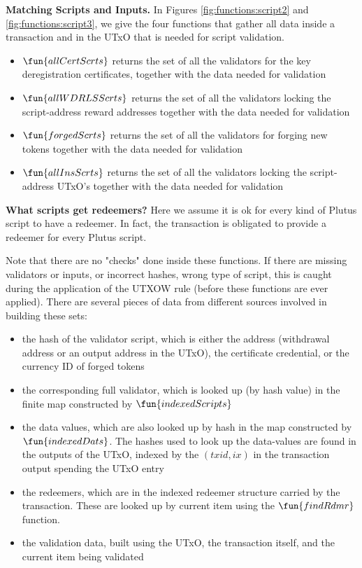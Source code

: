 \textbf{Matching Scripts and Inputs.}
In Figures \ref{fig:functions:script2} and \ref{fig:functions:script3},
we give the four functions that gather all data inside a transaction
and in the UTxO that is needed for script validation.

\begin{itemize}
\item $\fun{allCertScrts}$ returns the set of all the validators for the
key deregistration certificates, together
with the data needed for validation
\item $\fun{allWDRLSScrts}$ returns the set of all the validators locking
the script-address reward addresses together
with the data needed for validation
\item $\fun{forgedScrts}$ returns the set of all the validators for
forging new tokens together
with the data needed for validation
\item $\fun{allInsScrts}$ returns the set of all the validators locking
the script-address UTxO's together
with the data needed for validation
\end{itemize}


\begin{note}
\textbf{What scripts get redeemers?}
Here we assume it is ok for every kind of Plutus script to
have a redeemer. In fact, the transaction is obligated to provide a redeemer for
every Plutus script.
\end{note}

Note that there are no "checks" done inside these functions. If there are
missing validators or inputs, or incorrect hashes, wrong type of script,
this is caught during the application of the UTXOW
rule (before these functions are ever applied).
There are several pieces of data from different sources involved in building these
sets:

\begin{itemize}
\item the hash of the validator script, which is either the address (withdrawal
address or an output address in the UTxO),
the certificate credential, or the currency ID of forged tokens

\item the corresponding
full validator, which is looked up (by hash value) in the finite map
constructed by $\fun{indexedScripts}$

\item the data values, which are also looked up by hash in the map
constructed by $\fun{indexedDats}$.
The hashes used to look up the data-values are found in the outputs of the UTxO,
indexed by the $(txid,ix)$ in the transaction output spending the UTxO entry

\item the redeemers, which are in the indexed redeemer structure carried by the transaction.
These are looked up by current item using the $\fun{findRdmr}$ function.

\item the validation data, built using the UTxO, the transaction itself,
and the current item being validated
\end{itemize}

